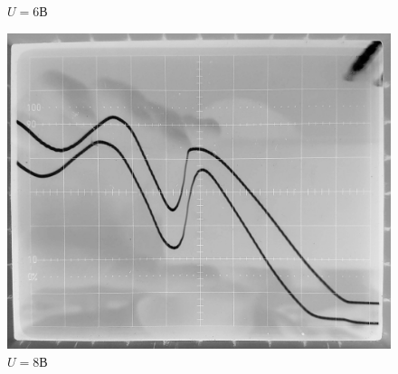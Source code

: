 \documentclass[a4paper, 12pt]{article}
\begin{document}
\begin{figure}[h!]
			\caption{$U=6$В}
		\endminipage\hfill
			\includegraphics[width=\linewidth]{20181011_100245.jpg}
			\caption{$U=8$В}
		\endminipage
	\end{figure}
	
\end{document}
